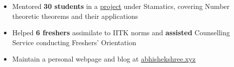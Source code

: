 \vspace{3mm}

\begin{itemize}
  \item Mentored \textbf{30 students} in a  \href{https://abhishekshree.github.io/number-theory-applications}{project} under Stamatics, covering Number theoretic theorems and their applications
  \item Helped \textbf{6 freshers} assimilate to IITK norms and \textbf{assisted} Counselling Service conducting Freshers' Orientation
  \item Maintain a personal webpage and blog at \href{https://abhishekshree.xyz/}{abhishekshree.xyz}
\end{itemize}
